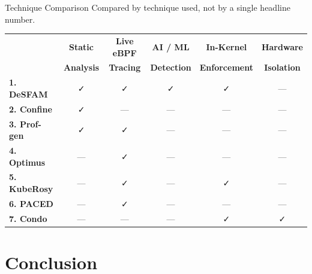 \documentclass[aspectratio=169,11pt]{beamer}
\begin{document}
\begin{frame}{Technique Comparison}
\small
Compared by technique used, not by a single headline number.

\vspace{0.2cm}
\centering
\renewcommand{\arraystretch}{1.4}
\begin{tabular}{@{}lccccc@{}}
\toprule
 & \textbf{Static} & \textbf{Live eBPF} & \textbf{AI / ML} & \textbf{In-Kernel} & \textbf{Hardware} \\
 & \textbf{Analysis} & \textbf{Tracing} & \textbf{Detection} & \textbf{Enforcement} & \textbf{Isolation} \\
\midrule
\textbf{1. DeSFAM}   & \faCheck & \faCheck & \faCheck & \faCheck & --- \\
\textbf{2. Confine}    & \faCheck & ---      & ---      & ---      & --- \\
\textbf{3. Prof-gen}   & \faCheck & \faCheck & ---      & ---      & --- \\
\textbf{4. Optimus}    & ---      & \faCheck & ---      & ---      & --- \\
\textbf{5. KubeRosy}   & ---      & \faCheck & ---      & \faCheck & --- \\
\textbf{6. PACED}      & ---      & \faCheck & ---      & ---      & --- \\
\textbf{7. Condo}      & ---      & ---      & ---      & \faCheck & \faCheck \\
\bottomrule
\end{tabular}
\end{frame}

\section{Conclusion}
\end{document}
